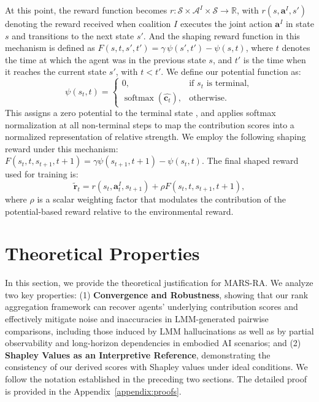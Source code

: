 \documentclass[11pt]{article}
\begin{document}
%

At this point, the reward function becomes $r: \mathcal{S} \times \mathcal{A}^I \times \mathcal{S} \to \mathbb{R}$, with \( r(s,     \boldsymbol{a}^I, s') \) denoting the reward received when coalition \( I \) executes the joint action \( \boldsymbol{a}^I \) in state \( s \) and transitions to the next state \( s' \). And the shaping reward function in this mechanism is defined as $F(s, t, s', t') = \gamma \, \psi(s', t') - \psi(s, t)$, where \( t \) denotes the time at which the agent was in the previous state \( s \), and \( t' \) is the time when it reaches the current state \( s' \), with \( t < t' \). We define our potential function as:
\begin{equation}
    \psi(s_t, t) = 
    \begin{cases} 
        0, & \text{if } s_t \text{ is terminal}, \\
        \operatorname{softmax}(\hat{\boldsymbol{c}_t}), & \text{otherwise}.
    \end{cases}
\end{equation}
This assigns a zero potential to the terminal state \cite{wierstra2008episodic}, and applies softmax normalization at all non-terminal steps to map the contribution scores into a normalized representation of relative strength. We employ the following shaping reward under this mechanism: $F(s_t, t, s_{t+1}, t+1) = \gamma  \psi(s_{t+1}, t+1) -  \psi(s_t, t)$. The final shaped reward used for training is:
\begin{equation}
\tilde{\boldsymbol{r}}_t = r(s_t, \boldsymbol{a}_t^I, s_{t+1}) + \rho F(s_t, t, s_{t+1}, t+1),
\end{equation}
where $\rho$ is a scalar weighting factor that modulates the contribution of the potential-based reward relative to the environmental reward.

\section{Theoretical Properties}
\label{sec:theory}

%

In this section, we provide the theoretical justification for MARS-RA. We analyze two key properties: (1) \textbf{Convergence and Robustness}, showing that our rank aggregation framework can recover agents’ underlying contribution scores and effectively mitigate noise and inaccuracies in LMM-generated pairwise comparisons, including those induced by LMM hallucinations as well as by partial observability and long-horizon dependencies in embodied AI scenarios; and (2) \textbf{Shapley Values as an Interpretive Reference}, demonstrating the consistency of our derived scores with Shapley values \cite{shapley1953value} under ideal conditions. We follow the notation established in the preceding two sections. The detailed proof is provided in the Appendix~\ref{appendix:proofs}.
\end{document}
